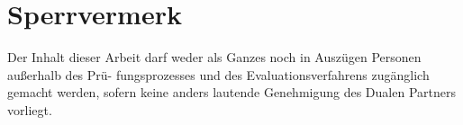 \section*{Sperrvermerk}

Der Inhalt dieser Arbeit darf weder als Ganzes noch in Auszügen Personen außerhalb des Prü-
fungsprozesses und des Evaluationsverfahrens zugänglich gemacht werden, sofern keine anders
lautende Genehmigung des Dualen Partners vorliegt.